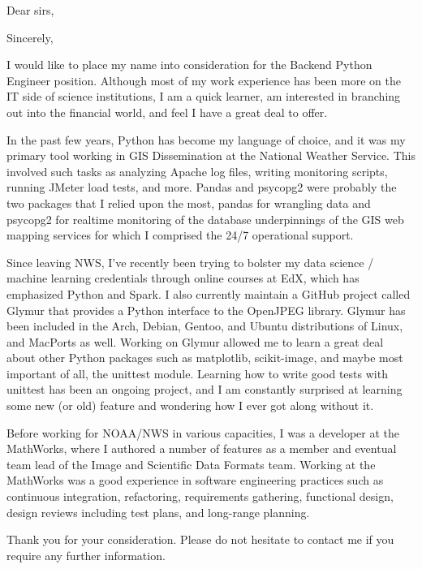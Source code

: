 \documentclass[11pt]{moderncv}  %
\begin{document}
\makecvtitle

\opening{Dear sirs,}
\closing{Sincerely,}


\makelettertitle

I would like to place my name into consideration for the Backend Python Engineer position.  Although most of my work experience has been more on the IT side of science institutions, I am a quick learner, am interested in branching out into the financial world, and feel I have a great deal to offer.

In the past few years, Python has become my language of choice, and it was my primary tool working in GIS Dissemination at the National Weather Service.  This involved such tasks as analyzing Apache log files, writing monitoring scripts, running JMeter load tests, and more.  Pandas and psycopg2 were probably the two packages that I relied upon the most, pandas for wrangling data and psycopg2 for realtime monitoring of the database underpinnings of the GIS web mapping services for which I comprised the 24/7 operational support.

Since leaving NWS, I've recently been trying to bolster my data science / machine learning credentials through online courses at EdX, which has emphasized Python and Spark.  I also currently maintain a GitHub project called Glymur that provides a Python interface to the OpenJPEG library.  Glymur has been included in the Arch, Debian, Gentoo, and Ubuntu distributions of Linux, and MacPorts as well.  Working on Glymur allowed me to learn a great deal about other Python packages such as matplotlib, scikit-image, and maybe most important of all, the unittest module.  Learning how to write good tests with unittest has been an ongoing project, and I am constantly surprised at learning some new (or old) feature and wondering how I ever got along without it.

Before working for NOAA/NWS in various capacities, I was a developer at the MathWorks, where I authored a number of features as a member and eventual team lead of the Image and Scientific Data Formats team.  Working at the MathWorks was a good experience in software engineering practices such as continuous integration, refactoring, requirements gathering, functional design, design reviews including test plans, and long-range planning.

Thank you for your consideration.  Please do not hesitate to contact me if you require any further information.

\makeletterclosing
\end{document}
